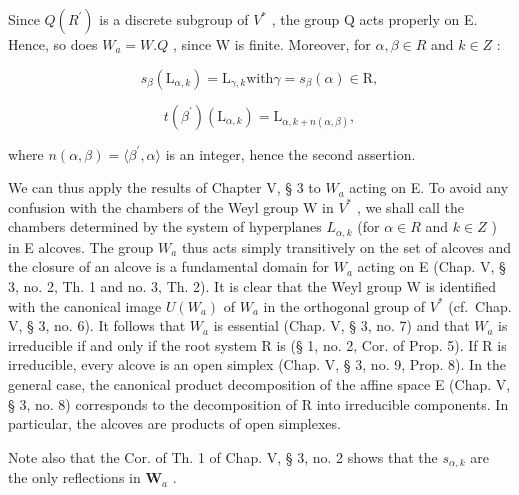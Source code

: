 Since \(Q(R^{\prime})\) is a discrete subgroup of \(V^{*}\) , the group Q acts properly on E. Hence, so does \(W_{a} = W.Q\) , since W is finite. Moreover, for \(\alpha, \beta \in R\) and \(k \in Z\) :

\[
s _ {\beta} (\mathrm{L} _ {\alpha , k}) = \mathrm{L} _ {\gamma , k} \text {with} \gamma = s _ {\beta} (\alpha) \in \mathrm{R},
\]

\[
t (\beta^ {\prime}) \left(\mathrm{L} _ {\alpha , k}\right) = \mathrm{L} _ {\alpha , k + n (\alpha , \beta)},
\]

where \(n(\alpha, \beta) = \langle \beta^{\prime}, \alpha \rangle\) is an integer, hence the second assertion.

We can thus apply the results of Chapter V, § 3 to \(W_{a}\) acting on E. To avoid any confusion with the chambers of the Weyl group W in \(V^{*}\) , we shall call the chambers determined by the system of hyperplanes \(L_{\alpha,k}\) (for \(\alpha \in R\) and \(k \in Z\) ) in E alcoves. The group \(W_{a}\) thus acts simply transitively on the set of alcoves and the closure of an alcove is a fundamental domain for \(W_{a}\) acting on E (Chap. V, § 3, no. 2, Th. 1 and no. 3, Th. 2). It is clear that the Weyl group W is identified with the canonical image \(U(W_{a})\) of \(W_{a}\) in the orthogonal group of \(V^{*}\) (cf.~Chap. V, § 3, no. 6). It follows that \(W_{a}\) is essential (Chap. V, § 3, no. 7) and that \(W_{a}\) is irreducible if and only if the root system R is (§ 1, no. 2, Cor. of Prop. 5). If R is irreducible, every alcove is an open simplex (Chap. V, § 3, no. 9, Prop. 8). In the general case, the canonical product decomposition of the affine space E (Chap. V, § 3, no. 8) corresponds to the decomposition of R into irreducible components. In particular, the alcoves are products of open simplexes.

Note also that the Cor. of Th. 1 of Chap. V, § 3, no. 2 shows that the \(s_{\alpha,k}\) are the only reflections in \(\mathbf{W}_a\) .

